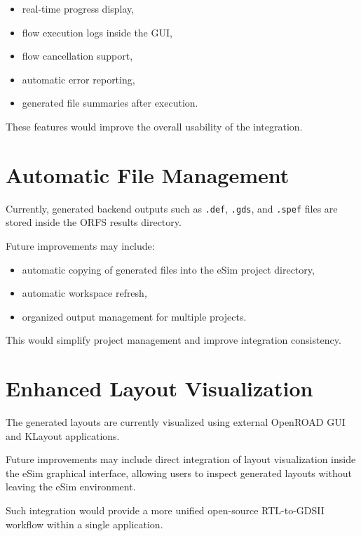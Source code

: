 \begin{itemize}
    \item real-time progress display,
    \item flow execution logs inside the GUI,
    \item flow cancellation support,
    \item automatic error reporting,
    \item generated file summaries after execution.
\end{itemize}

These features would improve the overall usability of the integration.

\section{Automatic File Management}

Currently, generated backend outputs such as \texttt{.def}, \texttt{.gds}, and \texttt{.spef} files are stored inside the ORFS results directory.

Future improvements may include:

\begin{itemize}
    \item automatic copying of generated files into the eSim project directory,
    \item automatic workspace refresh,
    \item organized output management for multiple projects.
\end{itemize}

This would simplify project management and improve integration consistency.

\section{Enhanced Layout Visualization}

The generated layouts are currently visualized using external OpenROAD GUI and KLayout applications.

Future improvements may include direct integration of layout visualization inside the eSim graphical interface, allowing users to inspect generated layouts without leaving the eSim environment.

Such integration would provide a more unified open-source RTL-to-GDSII workflow within a single application.